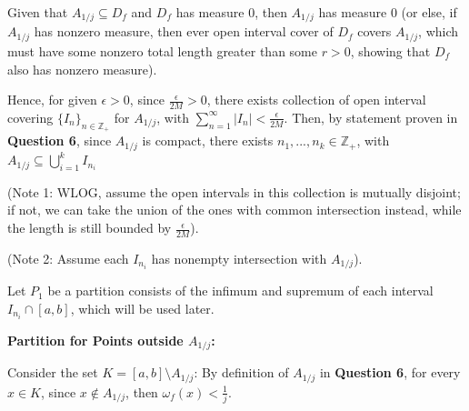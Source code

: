 \documentclass{article}
\begin{document}
\begin{itemize}
    \hfill

    Given that $A_{1/j}\subseteq D_f$ and $D_f$ has measure $0$, then $A_{1/j}$ has measure $0$ (or else, if $A_{1/j}$ has nonzero measure, then ever open interval cover of $D_f$ covers $A_{1/j}$, which must have some nonzero total length greater than some $r>0$, showing that $D_f$ also has nonzero measure).

    Hence, for given $\epsilon>0$, since $\frac{\epsilon}{2M}>0$, there exists collection of open interval covering $\{I_n\}_{n\in\mathbb{Z}_+}$ for $A_{1/j}$, with $\sum_{n=1}^{\infty}|I_n|<\frac{\epsilon}{2M}$.
    Then, by statement proven in \textbf{Question 6}, since $A_{1/j}$ is compact, there exists $n_1,...,n_k\in\mathbb{Z}_+$, with $A_{1/j}\subseteq \bigcup_{i=1}^{k}I_{n_i}$ 
    
    (Note 1: WLOG, assume the open intervals in this collection is mutually disjoint; if not, we can take the union of the ones with common intersection instead, while the length is still bounded by $\frac{\epsilon}{2M}$).
    
    (Note 2: Assume each $I_{n_i}$ has nonempty intersection with $A_{1/j}$).

    Let $P_1$ be a partition consists of the infimum and supremum of each interval $I_{n_i}\cap [a,b]$, which will be used later.

    \hfill

    \textbf{Partition for Points outside $A_{1/j}$:}

    Consider the set $K=[a,b]\setminus A_{1/j}$: By definition of $A_{1/j}$ in \textbf{Question 6}, for every $x\in K$, since $x\notin A_{1/j}$, then $\omega_f(x)<\frac{1}{j}$.

    

    
\end{itemize}
\end{document}
